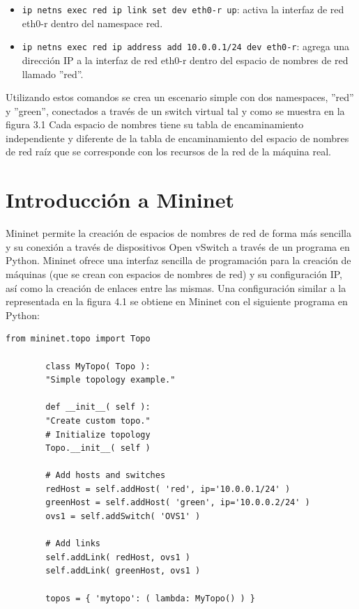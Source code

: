 \documentclass[a4paper, 12pt]{book}
\begin{document}
\begin{itemize}
		\item \verb*|ip netns exec red ip link set dev eth0-r up|: activa la interfaz de red eth0-r dentro del namespace red.
		
		\item \verb*|ip netns exec red ip address add 10.0.0.1/24 dev eth0-r|: agrega una dirección IP a la interfaz de red eth0-r dentro del espacio de nombres de red llamado ''red''.
		
		
		
		
		
		
	
	\end{itemize}
	
	Utilizando estos comandos se crea un escenario simple con dos namespaces, ''red'' y ''green'', conectados a través de un switch virtual tal y como se muestra en la figura 3.1 Cada espacio de nombres tiene su tabla de encaminamiento independiente y diferente de la tabla de encaminamiento del espacio de nombres de red raíz que se corresponde con los recursos de la red de la máquina real.
	

	
	
	\section{Introducción a Mininet}
	
	Mininet permite la creación de espacios de nombres de red de forma más sencilla y su conexión a través
	de dispositivos Open vSwitch a través de un programa en Python. Mininet ofrece una interfaz sencilla
	de programación para la creación de máquinas (que se crean con espacios de nombres de red) y su
	configuración IP, así como la creación de enlaces entre las mismas.
	Una configuración similar a la representada en la figura 4.1 se obtiene en Mininet con el siguiente
	programa en Python:
	
	 \begin{lstlisting}[caption={Ejemplo de topología simple en Mininet}, label={lst:mytopo}]
	 	from mininet.topo import Topo
	 	
	 	class MyTopo( Topo ):
	 	"Simple topology example."
	 	
	 	def __init__( self ):
	 	"Create custom topo."
	 	# Initialize topology
	 	Topo.__init__( self )
	 	
	 	# Add hosts and switches
	 	redHost = self.addHost( 'red', ip='10.0.0.1/24' )
	 	greenHost = self.addHost( 'green', ip='10.0.0.2/24' )
	 	ovs1 = self.addSwitch( 'OVS1' )
	 	
	 	# Add links
	 	self.addLink( redHost, ovs1 )
	 	self.addLink( greenHost, ovs1 )
	 	
	 	topos = { 'mytopo': ( lambda: MyTopo() ) }
	 \end{lstlisting}
	
\end{document}
